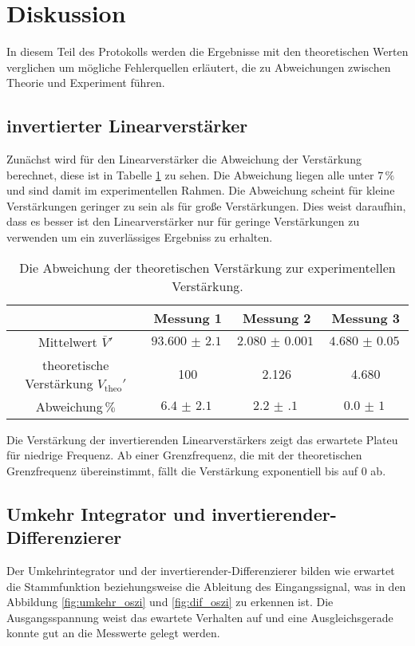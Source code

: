 \section{Diskussion}
\label{sec:diskussion}
In diesem Teil des Protokolls werden die Ergebnisse mit den theoretischen Werten verglichen um mögliche Fehlerquellen erläutert, die zu Abweichungen zwischen Theorie und Experiment führen.
\subsection{invertierter Linearverstärker}
Zunächst wird für den Linearverstärker die Abweichung der Verstärkung berechnet, diese ist in Tabelle \ref{tab:lin_disk} zu sehen.
Die Abweichung liegen alle unter $7\,\%$ und sind damit im experimentellen Rahmen.
Die Abweichung scheint für kleine Verstärkungen geringer zu sein als für große Verstärkungen.
Dies weist daraufhin, dass es besser ist den Linearverstärker nur für geringe Verstärkungen zu verwenden um ein zuverlässiges Ergebniss zu erhalten.
\begin{table}
    \centering
    \begin{tabular}{cccc}
        \toprule
        &Messung 1 & Messung 2 & Messung 3\\
        \midrule
        Mittelwert $\bar{V}'$ & $\SI{93.600(2100)}{}$ &  $\SI{2.080(1)}{} $&  $\SI{4.680(50)}{} $ \\
        theoretische Verstärkung $V_\text{theo}'$ & 100 & 2.126 & 4.680 \\
        Abweichung$\,\%$ & $\SI{6.4(21)}{} $& $\SI{2.2(1)}{}$ & $\SI{0.0(10)}{}$ \\
        \bottomrule
    \end{tabular}
    \caption{Die Abweichung der theoretischen Verstärkung zur experimentellen Verstärkung.}
    \label{tab:lin_disk}
\end{table}
Die Verstärkung der invertierenden Linearverstärkers zeigt das erwartete Plateu für niedrige Frequenz.
Ab einer Grenzfrequenz, die mit der theoretischen Grenzfrequenz übereinstimmt, fällt die Verstärkung exponentiell bis auf 0 ab.
\subsection{Umkehr Integrator und invertierender-Differenzierer}
Der Umkehrintegrator und der invertierender-Differenzierer bilden wie erwartet die Stammfunktion beziehungsweise die Ableitung des Eingangssignal, was in den Abbildung \ref{fig:umkehr_oszi} und \ref{fig:dif_oszi} zu erkennen ist.
Die Ausgangsspannung weist das ewartete Verhalten auf und eine Ausgleichsgerade konnte gut an die Messwerte gelegt werden.
